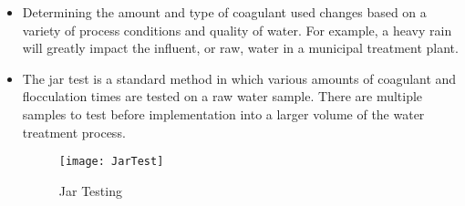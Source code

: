 \begin{itemize}
\item Determining the amount and type of coagulant used changes based on a variety of process conditions and quality of water. For example, a heavy rain will greatly impact the influent, or raw, water in a municipal treatment plant.

\item The jar test is a standard method in which various amounts of coagulant and flocculation times are tested on a raw water sample. There are multiple samples to test before implementation into a larger volume of the water treatment process.

\begin{figure}[h]
\begin{center}
\texttt{[image: JarTest]}
\caption{Jar Testing}
\end{center}
\end{figure}	

\end{itemize}
